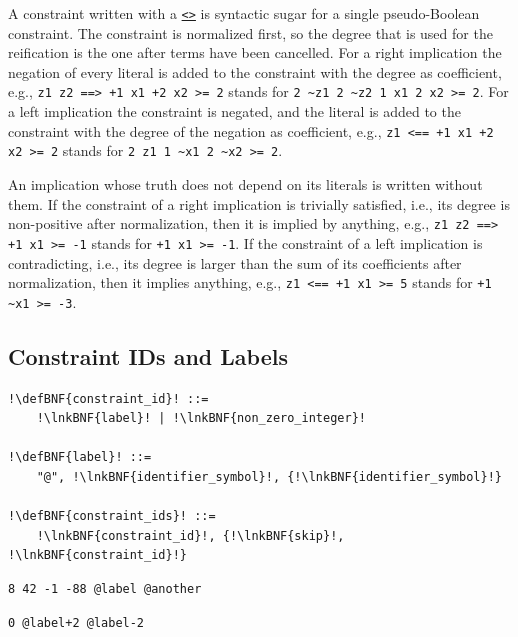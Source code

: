 \documentclass[a4paper]{article}
\newcommand{\defBNF}[1]{\hypertarget{def:#1}{<\detokenize{#1}>}}
\newcommand{\lnkBNF}[1]{\hyperlink{def:#1}{<\detokenize{#1}>}}
\begin{document}
A constraint written with a \texttt{\lnkBNF{reification}} is syntactic sugar for a single pseudo-Boolean constraint. The constraint is normalized first, so the degree that is used for the reification is the one after terms have been cancelled. For a right implication the negation of every literal is added to the constraint with the degree as coefficient, e.g., \lstinline[language=veripb]!z1 z2 ==> +1 x1 +2 x2 >= 2! stands for \lstinline[language=veripb]!2 ~z1 2 ~z2 1 x1 2 x2 >= 2!. For a left implication the constraint is negated, and the literal is added to the constraint with the degree of the negation as coefficient, e.g., \lstinline[language=veripb]!z1 <== +1 x1 +2 x2 >= 2! stands for \lstinline[language=veripb]!2 z1 1 ~x1 2 ~x2 >= 2!.

An implication whose truth does not depend on its literals is written without them. If the constraint of a right implication is trivially satisfied, i.e., its degree is non-positive after normalization, then it is implied by anything, e.g., \lstinline[language=veripb]!z1 z2 ==> +1 x1 >= -1! stands for \lstinline[language=veripb]!+1 x1 >= -1!. If the constraint of a left implication is contradicting, i.e., its degree is larger than the sum of its coefficients after normalization, then it implies anything, e.g., \lstinline[language=veripb]!z1 <== +1 x1 >= 5! stands for \lstinline[language=veripb]!+1 ~x1 >= -3!.


\subsection{Constraint IDs and Labels}\label{sec:constraint-ids}
\begin{lstlisting}
!\defBNF{constraint_id}! ::=
	!\lnkBNF{label}! | !\lnkBNF{non_zero_integer}!

!\defBNF{label}! ::=
	"@", !\lnkBNF{identifier_symbol}!, {!\lnkBNF{identifier_symbol}!}

!\defBNF{constraint_ids}! ::=
	!\lnkBNF{constraint_id}!, {!\lnkBNF{skip}!, !\lnkBNF{constraint_id}!}
\end{lstlisting}
\begin{minipage}{.49\linewidth}
	\begin{lstlisting}[language=veripb, gobble=4, rulecolor=\color{veripb-valid-text}, caption={Syntactically correct constraint IDs.}]
	8 42 -1 -88 @label @another
	\end{lstlisting}
\end{minipage}\hfill%
\begin{minipage}{.49\linewidth}
	\begin{lstlisting}[language=veripb, gobble=4, rulecolor=\color{veripb-invalid-text}, caption={Syntactically incorrect constraint IDs.}]
	0 @label+2 @label-2
	\end{lstlisting}
\end{minipage}
\end{document}

